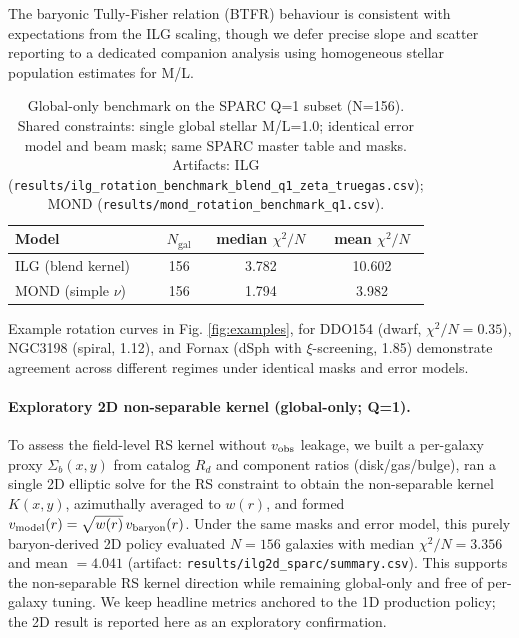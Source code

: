 \documentclass[fleqn,usenatbib]{mnras}
\begin{document}
The baryonic Tully-Fisher relation (BTFR) behaviour is consistent with expectations from the ILG scaling, though we defer precise slope and scatter reporting to a dedicated companion analysis using homogeneous stellar population estimates for M/L.

\begin{table}[h]
\centering
\caption{Global-only benchmark on the SPARC Q=1 subset (N=156). Shared constraints: single global stellar M/L=1.0; identical error model and beam mask; same SPARC master table and masks. Artifacts: ILG (\texttt{results/ilg\_rotation\_benchmark\_blend\_q1\_zeta\_truegas.csv}); MOND (\texttt{results/mond\_rotation\_benchmark\_q1.csv}).}
\label{tab:global_bench}
\begin{tabular}{l c c c}
\toprule
Model & $N_\mathrm{gal}$ & median $\chi^2/N$ & mean $\chi^2/N$ \\
\midrule
ILG (blend kernel) & 156 & 3.782 & 10.602 \\
MOND (simple $\nu$) & 156 & 1.794 & 3.982 \\
\bottomrule
\end{tabular}
\end{table}


Example rotation curves in Fig. \ref{fig:examples}, for DDO154 (dwarf, $\chi^2/N=0.35$), NGC3198 (spiral, 1.12), and Fornax (dSph with $\xi$-screening, 1.85) demonstrate agreement across different regimes under identical masks and error models.

\paragraph{Exploratory 2D non-separable kernel (global-only; Q=1).} To assess the field-level RS kernel without $v_{\rm obs}$ leakage, we built a per-galaxy proxy $\Sigma_b(x,y)$ from catalog $R_d$ and component ratios (disk/gas/bulge), ran a single 2D elliptic solve for the RS constraint to obtain the non-separable kernel $K(x,y)$, azimuthally averaged to $w(r)$, and formed $v_{\rm model}(r)=\sqrt{w(r)}\,v_{\rm baryon}(r)$. Under the same masks and error model, this purely baryon-derived 2D policy evaluated $N=156$ galaxies with median $\chi^2/N=\mathbf{3.356}$ and mean $=\mathbf{4.041}$ (artifact: \texttt{results/ilg2d\_sparc/summary.csv}). This supports the non-separable RS kernel direction while remaining global-only and free of per-galaxy tuning. We keep headline metrics anchored to the 1D production policy; the 2D result is reported here as an exploratory confirmation.
\end{document}
